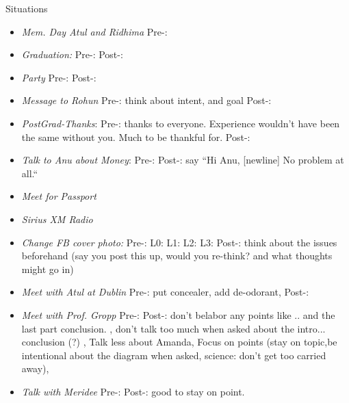 \documentclass[serif, mathserif, final]{beamer}
\begin{document}
\begin{frame}{}
\begin{columns}
\begin{column}{0.20\linewidth}
\begin{block}{Situations}
\begin{itemize}
        \item \tiny \textit{Mem. Day Atul and Ridhima} Pre-: 
      \item \tiny \textit{Graduation:} Pre-:   Post-: 
      \item \tiny \textit{Party } Pre-:  Post-:

      \item \tiny \textit{Message to Rohun} Pre-: think about intent,
        and goal Post-: 
        \item \tiny \textit{PostGrad-Thanks}: Pre-: thanks to
          everyone. Experience wouldn't have been the same without
          you. Much to be thankful for. Post-: %
          \item \tiny \textit{Talk to Anu about Money}: Pre-:   Post-:
            say ``Hi Anu,  [newline] No problem at all.`` 

            \item \tiny \textit{Meet for Passport}
            \item \tiny \textit{Sirius XM Radio} 

            \item \tiny \textit{Change FB cover photo:} Pre-: L0: L1:
              L2: L3: Post-: think about the issues beforehand (say
              you post this up, would you re-think? and what thoughts
              might go in) 
              \item \tiny \textit{Meet with Atul at Dublin} Pre-: put
                concealer, add de-odorant, Post-: 

              \item \tiny \textit{Meet with Prof. Gropp} Pre-:  Post-:
                don't belabor any points like .. and the last part
                conclusion. , don't talk too much when asked about the
                intro... conclusion (?) ,
                Talk less about Amanda, Focus on points (stay on
                topic,be intentional about the diagram when asked,
                science: don't get too carried away),
              \item \tiny \textit{Talk with Meridee} Pre-:  Post-:
                good to stay on point.


\end{itemize}
\end{block}
\end{column}
\end{columns}
\end{frame}
\end{document}
